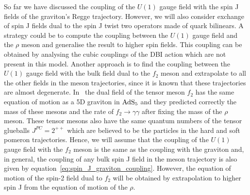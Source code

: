 \documentclass[a4paper,12pt]{article}
\begin{document}
So far we have discussed the coupling of the $U(1)$ gauge field with the spin J fields of the graviton's Regge trajectory. However, we will also consider exchange of spin J fields dual to the spin J twist two operators made of quark bilinears. A strategy could be to compute the coupling between the $U(1)$ gauge field and the $\rho$ meson and generalise the result to higher spin fields. This coupling can be obtained by analysing the cubic couplings of the DBI action which are not present in this model. Another approach is to find the coupling between the $U(1)$ gauge field with the bulk field dual to the $f_2$ meson and extrapolate to all the other fields in the meson trajectories, since it is known that these trajectories are almost degenerate. In~\cite{Katz:2005ir} the dual field of the tensor meson $f_2$ has the same equation of motion as a 5D graviton in $\rm{AdS}_5$ and they predicted correctly the mass of these mesons and the rate of $f_2 \to \gamma \gamma$ after fixing the mass of the $\rho$ meson. These tensor mesons also have the same quantum numbers of the tensor glueballs  $J^{PC} = 2^{++}$ which are believed to be the particles in the hard and soft pomeron trajectories. Hence, we will assume that the coupling of the  $U(1)$ gauge field with the $f_2$ meson is the same as the coupling with the graviton and, in general, the coupling of any bulk spin J field in the meson trajectory is also given by equation~\ref{eq:spin_J_graviton_coupling}. However, the equation of motion of the spin-2 field dual to $f_2$ will be obtained by extrapolation to higher spin J from the equation of motion of the $\rho$.




\end{document}
